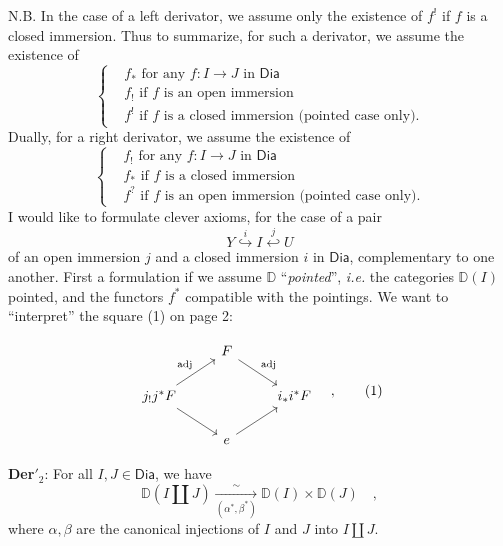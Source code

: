 \documentclass[11pt]{article}
\newcommand{\printedpage}[1]{\marginpar{\footnotesize p.~#1}}
\newcommand{\msp}[1]{\marginpar{\footnotesize [#1]}}
\newcommand{\Dia}{\mathsf{Dia}}
\newcommand{\DD}{\mathbb{D}}
\begin{document}
N.B. In the case of a left derivator, we assume only the existence of $f^!$ if $f$ is a closed immersion. Thus to summarize, for such a derivator, we assume the existence of
\[
\left\{
\begin{aligned}
& f_* \text{ for any } f : I \to J \text{ in } \Dia \\
& f_! \text{ if } f \text{ is an open immersion} \\
& f^! \text{ if } f \text{ is a closed immersion (pointed case only).}
\end{aligned}
\right.
\]
Dually, for a right derivator, we assume the existence of
\[
\left\{
\begin{aligned}
& f_! \text{ for any } f : I \to J \text{ in } \Dia \\
& f_* \text{ if } f \text{ is a closed immersion} \\
& f^? \text{ if } f \text{ is an open immersion (pointed case only).}
\end{aligned}
\right.
\]
I would like to formulate clever axioms, for the case of a pair
\[ Y \overset{i}{\hookrightarrow} I \overset{j}{\hookleftarrow} U \]
of an open immersion $j$ and a closed immersion $i$ in $\Dia$, complementary to one another. First a formulation if we assume $\DD$ ``\textit{pointed}'', \textit{i.e.} the categories $\DD(I)$ pointed, and the functors $f^*$ compatible with the pointings. We want to ``interpret'' the square (1) on page 2:

\msp{page 8}

\[
\begin{tikzcd}
& F \arrow[dr, "\mathrm{adj}"] & \\
j_!j^*F \arrow[ur, "\mathrm{adj}"] \arrow[dr] & & i_*i^*F \\
& e \arrow[ur] &
\end{tikzcd}
\quad ,
\tag*{(1)}
\]

\textbf{Der}$'_2$: For all $I, J \in \Dia$, we have
\[ \DD(I \amalg J) \xrightarrow[(\alpha^*, \beta^*)]{\sim} \DD(I) \times \DD(J) \quad , \]
where $\alpha, \beta$ are the canonical injections of $I$ and $J$ into $I \amalg J$.

\printedpage{7}
\end{document}
